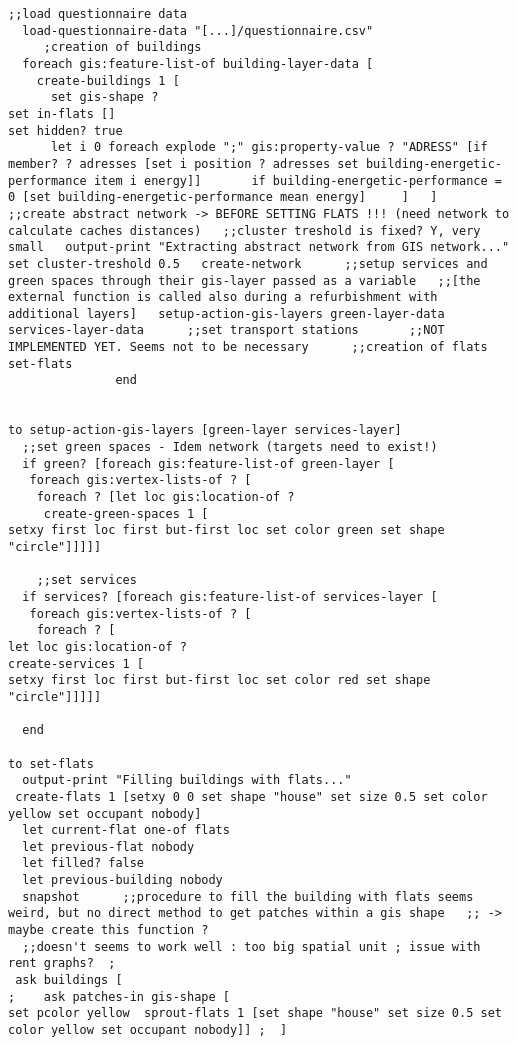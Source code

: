 \documentclass[english]{article}
\begin{document}
\begin{lstlisting}[basicstyle={\scriptsize}]
    ;;load questionnaire data
  load-questionnaire-data "[...]/questionnaire.csv"
     ;creation of buildings
  foreach gis:feature-list-of building-layer-data [
    create-buildings 1 [
      set gis-shape ?
set in-flats []
set hidden? true
      let i 0 foreach explode ";" gis:property-value ? "ADRESS" [if member? ? adresses [set i position ? adresses set building-energetic-performance item i energy]]       if building-energetic-performance = 0 [set building-energetic-performance mean energy]     ]   ]            ;;create abstract network -> BEFORE SETTING FLATS !!! (need network to calculate caches distances)   ;;cluster treshold is fixed? Y, very small   output-print "Extracting abstract network from GIS network..."   set cluster-treshold 0.5   create-network      ;;setup services and green spaces through their gis-layer passed as a variable   ;;[the external function is called also during a refurbishment with additional layers]   setup-action-gis-layers green-layer-data services-layer-data      ;;set transport stations       ;;NOT IMPLEMENTED YET. Seems not to be necessary      ;;creation of flats   set-flats     
               end


to setup-action-gis-layers [green-layer services-layer]
  ;;set green spaces - Idem network (targets need to exist!)
  if green? [foreach gis:feature-list-of green-layer [
   foreach gis:vertex-lists-of ? [
    foreach ? [let loc gis:location-of ?
     create-green-spaces 1 [
setxy first loc first but-first loc set color green set shape "circle"]]]]]

    ;;set services
  if services? [foreach gis:feature-list-of services-layer [
   foreach gis:vertex-lists-of ? [
    foreach ? [
let loc gis:location-of ?
create-services 1 [
setxy first loc first but-first loc set color red set shape "circle"]]]]]

  end

to set-flats
  output-print "Filling buildings with flats..."
 create-flats 1 [setxy 0 0 set shape "house" set size 0.5 set color yellow set occupant nobody]
  let current-flat one-of flats
  let previous-flat nobody
  let filled? false
  let previous-building nobody
  snapshot      ;;procedure to fill the building with flats seems weird, but no direct method to get patches within a gis shape   ;; -> maybe create this function ?
  ;;doesn't seems to work well : too big spatial unit ; issue with rent graphs?  ;
 ask buildings [
;    ask patches-in gis-shape [
set pcolor yellow  sprout-flats 1 [set shape "house" set size 0.5 set color yellow set occupant nobody]] ;  ]
    

\end{lstlisting}
\end{document}
